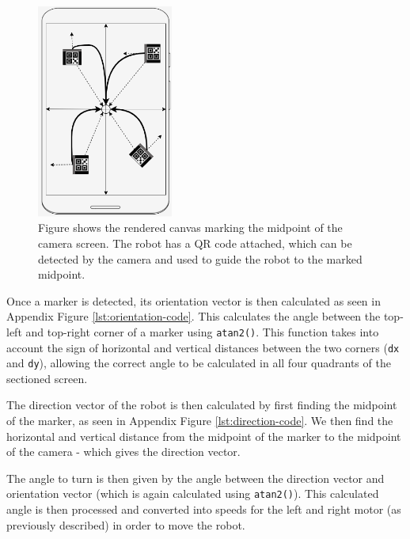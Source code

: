 \documentclass{l4proj}
\begin{document}
\begin{figure}
    \centering
    \includegraphics[width=0.4\textwidth]{images/virtual-lead-design.png}
    \caption{Figure shows the rendered canvas marking the midpoint of the camera screen. The robot has a QR code attached, which can be detected by the camera and used to guide the robot to the marked midpoint.}
    \label{fig:virtual-lead-camera}
\end{figure}

Once a marker is detected, its orientation vector is then calculated as seen in Appendix Figure \ref{lst:orientation-code}. This calculates the angle between the top-left and top-right corner of a marker using \lstinline{atan2()}. This function takes into account the sign of horizontal and vertical distances between the two corners (\lstinline{dx} and \lstinline{dy}), allowing the correct angle to be calculated in all four quadrants of the sectioned screen.

The direction vector of the robot is then calculated by first finding the midpoint of the marker, as seen in Appendix Figure \ref{lst:direction-code}. We then find the horizontal and vertical distance from the midpoint of the marker to the midpoint of the camera - which gives the direction vector. 

The angle to turn is then given by the angle between the direction vector and orientation vector (which is again calculated using \lstinline{atan2()}). This calculated angle is then processed and converted into speeds for the left and right motor (as previously described) in order to move the robot.
\end{document}
